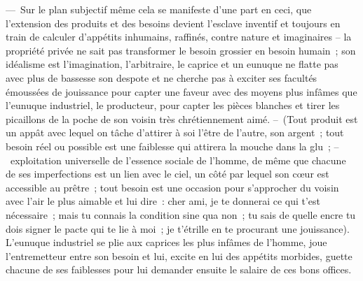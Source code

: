 \documentclass[french,twoside]{book} %
\begin{document}
— Sur le plan subjectif même cela se manifeste d’une part en ceci, que l’extension des produits et des besoins devient l’esclave inventif et toujours en train de calculer d’appétits inhumains, raffinés, contre nature et imaginaires – la propriété privée ne sait pas transformer le besoin grossier en besoin humain ; son idéalisme est l’imagination, l’arbitraire, le caprice et un eunuque ne flatte pas avec plus de bassesse son despote et ne cherche pas à exciter ses facultés émoussées de jouissance pour capter une faveur avec des moyens plus infâmes que l’eunuque industriel, le producteur, pour capter les pièces blanches et tirer les picaillons de la poche de son voisin très chrétiennement aimé. – (Tout produit est un appât avec lequel on tâche d’attirer à soi l’être de l’autre, son argent ; tout besoin réel ou possible est une faiblesse qui attirera la mouche dans la glu ; – exploitation universelle de l’essence sociale de l’homme, de même que chacune de ses imperfections est un lien avec le ciel, un côté par lequel son cœur est accessible au prêtre ; tout besoin est une occasion pour s’approcher du voisin avec l’air le plus aimable et lui dire : cher ami, je te donnerai ce qui t’est nécessaire ; mais tu connais la condition sine qua non ; tu sais de quelle encre tu dois signer le pacte qui te lie à moi ; je t’étrille en te procurant une jouissance). L’eunuque industriel se plie aux caprices les plus infâmes de l’homme, joue l’entremetteur entre son besoin et lui, excite en lui des appétits morbides, guette chacune de ses faiblesses pour lui demander ensuite le salaire de ces bons offices.\par
\end{document}
